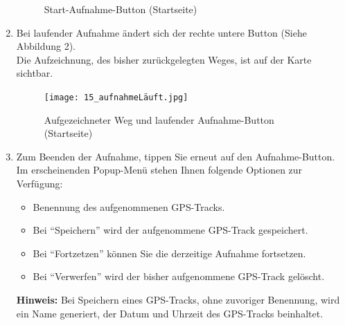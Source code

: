 \documentclass{article}
\begin{document}
\begin{enumerate}
\begin{figure}[H]
		\centering
		\caption{Start-Aufnahme-Button (Startseite)}
	\end{figure}
	\newpage
\item Bei laufender Aufnahme ändert sich der rechte untere Button (Siehe Abbildung 2). \\
Die Aufzeichnung, des bisher zurückgelegten Weges, ist auf der Karte sichtbar.
	\begin{figure}[H]
		\texttt{[image: 15\_aufnahmeLäuft.jpg]}
		\centering
		\caption{ Aufgezeichneter Weg und laufender Aufnahme-Button (Startseite)}
	\end{figure}
	\newpage
\item Zum Beenden der Aufnahme, tippen Sie erneut auf den Aufnahme-Button.\\
Im erscheinenden Popup-Menü stehen Ihnen folgende Optionen zur Verfügung:
\begin{itemize}
	\item Benennung des aufgenommenen GPS-Tracks.
    \item Bei "`Speichern"' wird der aufgenommene GPS-Track gespeichert.
    \item Bei "`Fortzetzen"' können Sie die derzeitige Aufnahme fortsetzen.
    \item Bei "`Verwerfen"' wird der bisher aufgenommene GPS-Track gelöscht. \par\medskip
\end{itemize}
\textbf{Hinweis:} Bei Speichern eines GPS-Tracks, ohne zuvoriger Benennung, wird ein Name generiert,
 der Datum und Uhrzeit des GPS-Tracks beinhaltet.
	\begin{figure}[H]

\end{figure}
\end{enumerate}
\end{document}
